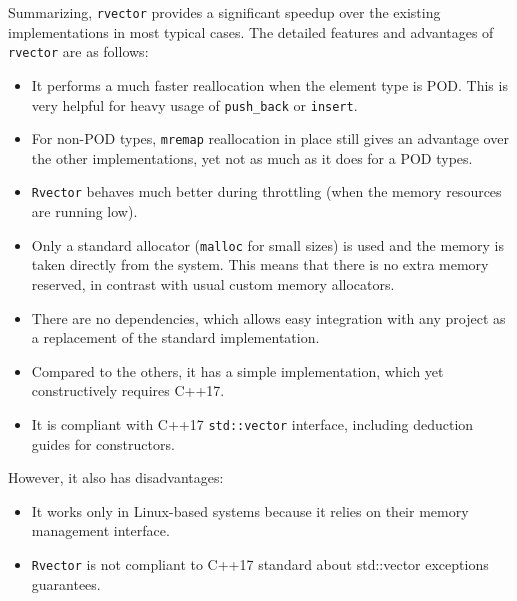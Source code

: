 \documentclass[inz, english, shortabstract]{iithesis}
\begin{document}
Summarizing, {\tt rvector} provides a significant speedup over the existing implementations in most typical cases.
The detailed features and advantages of {\tt rvector} are as follows:
\begin{itemize}
\item It performs a much faster reallocation when the element type is POD. This is very helpful for heavy usage of {\tt push\_back} or {\tt insert}.
\item For non-POD types, {\tt mremap} reallocation in place still gives an advantage over the other implementations, yet not as much as it does for a POD types.
\item {\tt Rvector} behaves much better during throttling (when the memory resources are running low).
\item Only a standard allocator ({\tt malloc} for small sizes) is used and the memory is taken directly from the system. This means that there is no extra memory reserved, in contrast with usual custom memory allocators.
\item There are no dependencies, which allows easy integration with any project as a replacement of the standard implementation.
\item Compared to the others, it has a simple implementation, which yet constructively requires C++17.
\item It is compliant with C++17 {\tt std::vector} interface, including deduction guides for constructors.
\end{itemize}
However, it also has disadvantages:
\begin{itemize}
\item It works only in Linux-based systems because it relies on their memory management interface.
\item {\tt Rvector} is not compliant to C++17 standard about std::vector exceptions guarantees.
\end{itemize}

\end{document}
